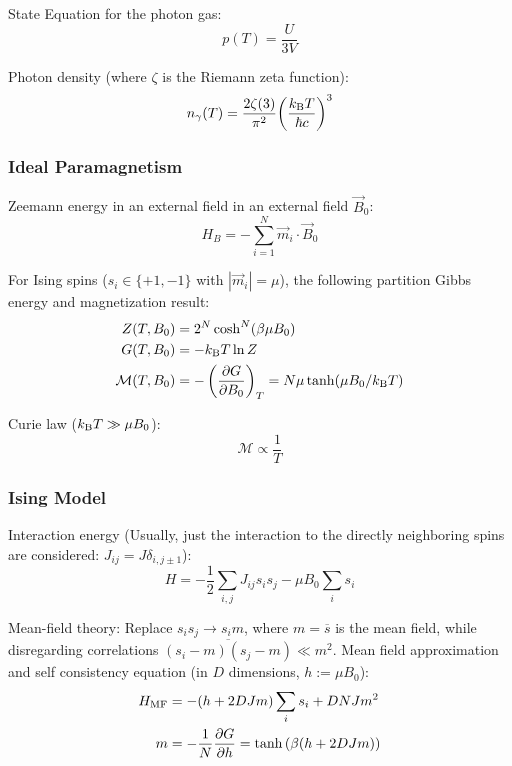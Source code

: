 			\noindent
			State Equation for the photon gas:
			\begin{equation}
				p(T) = \frac{U}{3V}
			\end{equation}

			\noindent
			Photon density (where $\zeta$ is the Riemann zeta function):
			\begin{equation}
				n_\gamma(T) = \frac{2\zeta(3)}{\pi^2} \qty(\frac{k_{\text{B}} T}{\hbar c})^3
			\end{equation}

		\subsubsection{Ideal Paramagnetism}
			\noindent
			Zeemann energy in an external field in an external field $\vec{B}_0$:
			\begin{equation}
				H_B = -\sum_{i=1}^N \vec{m}_i \cdot \vec{B}_0
			\end{equation}

			\noindent
			For Ising spins ($s_i\in\lbrace +1, -1\rbrace$ with $|\vec{m}_i| = \mu$), the following partition Gibbs energy and magnetization result:
			\begin{equation}
				\begin{aligned}
					Z(T,B_0) &= 2^N \cosh^N (\beta\mu B_0) \\
					G(T,B_0) &= -k_{\text{B}} T \ln Z \\
					\mathcal{M}(T,B_0) &= -\left(\pdv{G}{B_0}\right)_T = N\mu \tanh(\mu B_0 /k_{\text{B}} T)
				\end{aligned}
			\end{equation}

			\noindent
			Curie law ($k_{\text{B}} T \gg \mu B_0$):
			\begin{equation}
				\mathcal{M} \propto \frac{1}{T}
			\end{equation}

		\subsubsection{Ising Model}
			\noindent
			Interaction energy (Usually, just the interaction to the directly neighboring spins are considered: $J_{ij} = J \delta_{i,j\pm 1}$):
			\begin{equation}
				H = -\frac{1}{2}\sum_{i,j} J_{ij} s_i s_j -\mu B_0 \sum_i s_i
			\end{equation}

			\noindent
			Mean-field theory: \newline
			Replace $s_i s_j \to s_i m$, where $m = \overline{s}$ is the mean field, while disregarding correlations $\overline{(s_i-m)(s_j-m)}\ll m^2$. \nl
			Mean field approximation and self consistency equation (in $D$ dimensions, $h:=\mu B_0$):
			\begin{equation}
				\begin{aligned}
					H_\text{MF} &= -(h + 2 D J m) \sum_i s_i + D N J m^2 \\
					m &= -\frac{1}{N}\pdv{G}{h} = \tanh\left({\beta(h + 2 D J m)}\right)
				\end{aligned}
			\end{equation}
